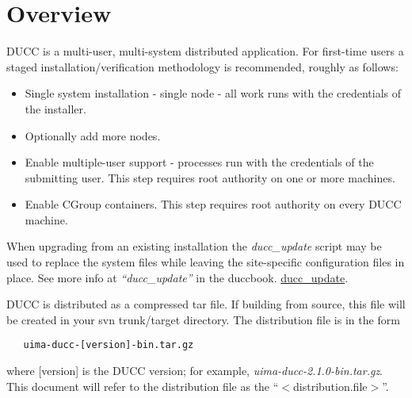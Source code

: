 % 
% 
% 
% 
\section{Overview}

DUCC is a multi-user, multi-system distributed application.
For first-time users a staged installation/verification methodology is recommended,
roughly as follows:

\begin{itemize}
    \item Single system installation - single node - all work runs with the credentials of the installer.
      
    \item Optionally add more nodes. 
      
    \item Enable multiple-user support - processes run with the credentials of the submitting user.
      This step requires root authority on one or more machines.
      
    \item Enable CGroup containers. This step requires root authority on every DUCC machine.
\end{itemize}

When upgrading from an existing installation the {\em ducc\_update} script may be used
to replace the system files while leaving the site-specific configuration files in place. 
See more info at
\ifdefined\DUCCSTANDALONE
{\em ``ducc\_update''} in the duccbook. 
\else
\hyperref[subsec:admin.ducc-update] {ducc\_update}. 
\fi


DUCC is distributed as a compressed tar file.  If building from source, this file will be created in your svn
trunk/target directory. The distribution file is in the form
\begin{verbatim}
   uima-ducc-[version]-bin.tar.gz
\end{verbatim}
where [version] is the DUCC version; for example, {\em uima-ducc-2.1.0-bin.tar.gz}.  This document will refer to the distribution
file as the ``$<$distribution.file$>$''.

